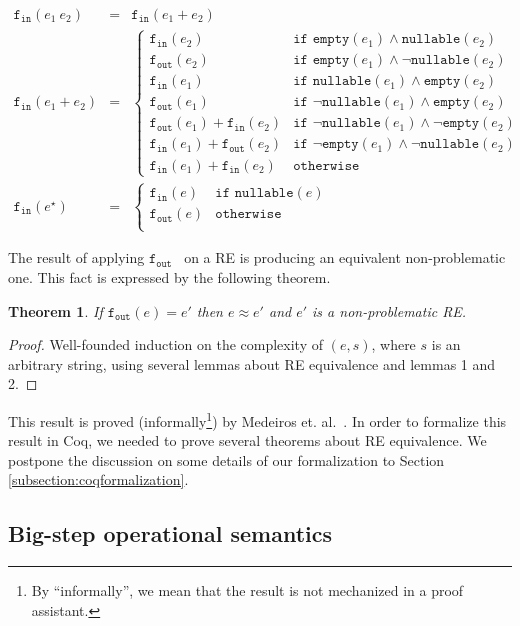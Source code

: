 \documentclass[oneside,12pt]{scrbook}
\newtheorem{Theorem}{Theorem}
\theoremstyle{definition}
\newcommand{\nullable}{\ensuremath{\texttt{nullable}}}
\newcommand{\emptyy}{\ensuremath{\texttt{empty}}}
\newcommand{\fin}{\ensuremath{\texttt{f$_{\texttt{in}}$}}}
\newcommand{\fout}{\ensuremath{\texttt{f$_{\texttt{out}}$}}}
\theoremstyle{plain}
\theoremstyle{definition}
\begin{document}
\[
\begin{array}{lcl}
\fin(e_1\:e_2) & = & \fin(e_1+e_2)\\
\fin(e_1 + e_2) & = & \left\{
\begin{array}{ll}
\fin(e_2)  & \texttt{if }\emptyy(e_1) \land \nullable(e_2)\\
\fout(e_2) & \texttt{if }\emptyy(e_1) \land \neg \nullable(e_2)\\
\fin(e_1)  & \texttt{if }\nullable(e_1) \land \emptyy(e_2)\\
\fout(e_1) & \texttt{if }\neg \nullable(e_1) \land \emptyy(e_2)\\
\fout(e_1) + \fin(e_2) & \texttt{if }\neg \nullable(e_1) \land \neg\emptyy(e_2)\\
\fin(e_1) + \fout(e_2) & \texttt{if }\neg \emptyy(e_1) \land \neg \nullable(e_2)\\
\fin(e_1) + \fin(e_2) & \texttt{otherwise}
\end{array}
\right. \\
\fin(e^\star) & = & \left\{
\begin{array}{ll}
\fin(e) & \texttt{if }\nullable(e)\\
\fout(e) & \texttt{otherwise}\\
\end{array}
\right.
\end{array}
\]

The result of applying \fout~ on a RE is producing an equivalent non-problematic one. This fact is expressed
by the following theorem. 

\begin{Theorem}
	If $\fout(e) = e'$ then $e \approx e'$ and $e'$ is a non-problematic RE.
\end{Theorem}
\begin{proof}
	Well-founded induction on the complexity of $(e,s)$, where $s$ is an arbitrary string, using
	several lemmas about RE equivalence and lemmas 1 and 2.
\end{proof}

This result is proved (informally\footnote{By ``informally'', we mean that the
	result is not mechanized in a proof assistant.}) by Medeiros et. al.~\cite{Medeiros14}. In order to formalize this result
in Coq, we needed to prove several theorems about RE equivalence. We postpone the discussion on some details
of our formalization to Section \ref{subsection:coqformalization}.

\subsection{Big-step operational semantics}\label{subsection:bigstep}
\end{document}

